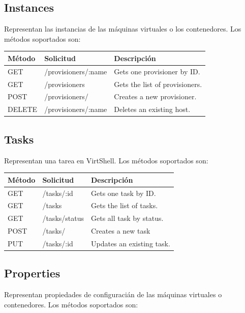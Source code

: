 \documentclass[conference, spanish]{IEEEtran}
\begin{document}
\subsection{Instances}
Representan las instancias de las máquinas virtuales o los contenedores. Los métodos soportados son:

\begin{center}
 \small
 \begin{tabular}{| l | l | l |}
 \hline
  \textbf{Método} & \textbf{Solicitud} & \textbf{Descripción} \\ [0.5ex] 
  \hline\hline
  GET & /provisioners/:name & Gets one provisioner by ID. \\
  \hline
  GET & /provisioners & Gets the list of provisioners. \\
  \hline  
  POST & /provisioners/ & Creates a new provisioner. \\
  \hline
  DELETE & /provisioners/:name & Deletes an existing host. \\ [1ex] 
  \hline
\end{tabular}
\end{center}


\subsection{Tasks}
Representan una tarea en VirtShell. Los métodos soportados son:

\begin{center}
 \small
 \begin{tabular}{| l | l | l |}
 \hline
  \textbf{Método} & \textbf{Solicitud} & \textbf{Descripción} \\ [0.5ex] 
  \hline\hline
  GET & /tasks/:id & Gets one task by ID. \\
  \hline
  GET & /tasks & Gets the list of tasks. \\
  \hline
  GET & /tasks/status & Gets all task by status. \\
  \hline 
  POST & /tasks/ & Creates a new task \\
  \hline  
  PUT & /tasks/:id & Updates an existing task. \\ [1ex] 
  \hline
\end{tabular}
\end{center}

\subsection{Properties}
Representan propiedades de configuracián de las máquinas virtuales o contenedores. Los métodos soportados son:
\end{document}
